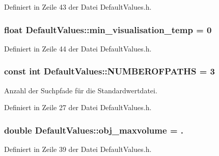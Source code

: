 Definiert in Zeile 43 der Datei Default\-Values.\-h.

\hypertarget{classDefaultValues_af370e72384712db1cd6eb225327d8c8d}{
\subsubsection[{min\-\_\-visualisation\-\_\-temp}]{\setlength{\rightskip}{0pt plus 5cm}float Default\-Values\-::min\-\_\-visualisation\-\_\-temp = 0}}\label{classDefaultValues_af370e72384712db1cd6eb225327d8c8d}


Definiert in Zeile 44 der Datei Default\-Values.\-h.

\hypertarget{classDefaultValues_a22795666a3d9f21c2767babec8a49a7a}{
\subsubsection[{N\-U\-M\-B\-E\-R\-O\-F\-P\-A\-T\-H\-S}]{\setlength{\rightskip}{0pt plus 5cm}const int Default\-Values\-::\-N\-U\-M\-B\-E\-R\-O\-F\-P\-A\-T\-H\-S = 3\hspace{0.3cm}{\ttfamily [static]}}}\label{classDefaultValues_a22795666a3d9f21c2767babec8a49a7a}


Anzahl der Suchpfade für die Standardwertdatei. 



Definiert in Zeile 27 der Datei Default\-Values.\-h.

\hypertarget{classDefaultValues_af9b712688c52236728bb5bd6714b6b8c}{
\subsubsection[{obj\-\_\-maxvolume}]{\setlength{\rightskip}{0pt plus 5cm}double Default\-Values\-::obj\-\_\-maxvolume = .}}\label{classDefaultValues_af9b712688c52236728bb5bd6714b6b8c}


Definiert in Zeile 39 der Datei Default\-Values.\-h.

